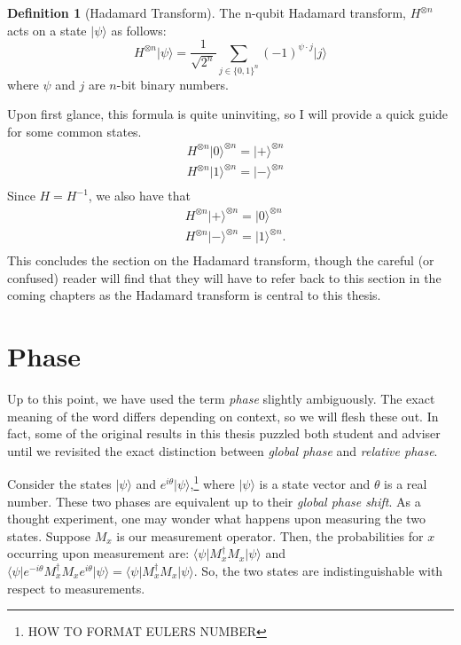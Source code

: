 \documentclass[12pt,twoside]{reedthesis}
\theoremstyle{definition}
\newtheorem{definition}[theorem]{Definition}
\newcommand{\ketz}{\ensuremath{\lvert 0\rangle}\xspace}
\newcommand{\keto}{\ensuremath{\lvert 1\rangle}\xspace}
\newcommand{\ket}[1]{\ensuremath{\lvert #1\rangle}\xspace}
\newcommand{\bra}[1]{\ensuremath{\langle #1\vert}\xspace}
\newcommand{\Hplus}{\ensuremath{\lvert + \rangle}\xspace}
\newcommand{\Hminus}{\ensuremath{\lvert- \rangle}\xspace}
\begin{document}
\begin{definition}[Hadamard Transform] The n-qubit Hadamard transform, $H^{\otimes n}$ acts on a state $\ket{\psi}$ as follows:
\begin{equation*}
H^{\otimes n} \ket{\psi} = \frac{1}{\sqrt{2^n}} \sum_{j \in \{0,1\}^n} (-1)^{\psi \cdot j} \ket{j}
\end{equation*}
where $\psi$ and $j$ are $n$-bit binary numbers.
\end{definition}
Upon first glance, this formula is quite uninviting, so I will provide a quick guide for some common states. 
\begin{align*}
& H^{\otimes n} \ketz^{\otimes n} = \Hplus^{\otimes n} \\
& H^{\otimes n} \keto^{\otimes n} = \Hminus^{\otimes n} \\
\end{align*}
Since $H = H^{-1}$, we also have that
\begin{align*}
& H^{\otimes n} \Hplus^{\otimes n} =  \ketz^{\otimes n} \\
& H^{\otimes n} \Hminus^{\otimes n} = \keto^{\otimes n}. \\
\end{align*}
This concludes the section on the Hadamard transform, though the careful (or confused) reader will find that they will have to refer back to this section in the coming chapters as the Hadamard transform is central to this thesis. 

\section{Phase}
Up to this point, we have used the term \textit{phase} slightly ambiguously. The exact meaning of the word differs depending on context, so we will flesh these out. In fact, some of the original results in this thesis puzzled both student and adviser until we revisited the exact distinction between \textit{global phase} and \textit{relative phase}.

Consider the states $\ket{\psi}$ and $e^{i \theta}\ket{\psi}$,\footnote{HOW TO FORMAT EULERS NUMBER} where $\ket{\psi}$ is a state vector and $\theta$ is a real number. These two phases are equivalent up to their \textit{global phase shift}. As a thought experiment, one may wonder what happens upon measuring the two states. Suppose $M_x$ is our measurement operator. Then, the probabilities for $x$ occurring upon measurement are: $\bra{\psi}M_x^\dagger M_x \ket{\psi}$ and $\bra{\psi}e^{-i\theta}M_x^\dagger M_x e^{i\theta}\ket{\psi} = \bra{\psi}M_x^\dagger M_x \ket{\psi}.$ So, the two states are indistinguishable with respect to measurements. 
\end{document}
